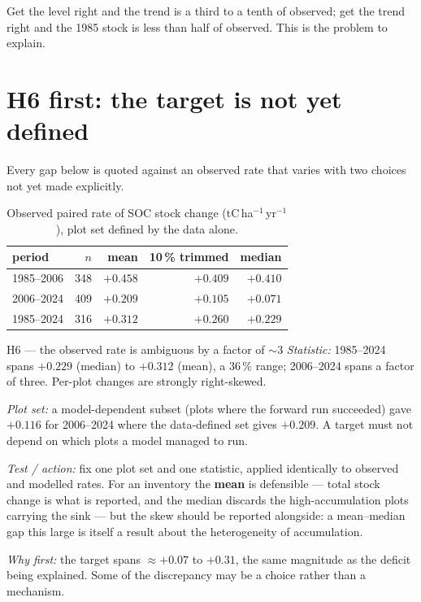 \documentclass[11pt]{article}
\begin{document}
\noindent Get the level right and the trend is a third to a tenth of observed; get the trend right
and the 1985 stock is less than half of observed. This is the problem to explain.

\section{H6 first: the target is not yet defined}

Every gap below is quoted against an observed rate that varies with two choices not yet made
explicitly.

\begin{table}[H]\centering\small
\caption{Observed paired rate of SOC stock change (tC\,ha$^{-1}$\,yr$^{-1}$), plot set defined by
the data alone.}
\begin{tabular}{lrrrr}
\toprule
period & $n$ & mean & 10\,\% trimmed & median\\
\midrule
1985--2006 & 348 & $+0.458$ & $+0.409$ & $+0.410$\\
2006--2024 & 409 & $+0.209$ & $+0.105$ & $+0.071$\\
1985--2024 & 316 & $+0.312$ & $+0.260$ & $+0.229$\\
\bottomrule
\end{tabular}
\end{table}

\begin{hyp}{H6 --- the observed rate is ambiguous by a factor of $\sim$3}
\emph{Statistic:} 1985--2024 spans $+0.229$ (median) to $+0.312$ (mean), a 36\,\% range; 2006--2024
spans a factor of three. Per-plot changes are strongly right-skewed.

\emph{Plot set:} a model-dependent subset (plots where the forward run succeeded) gave $+0.116$
for 2006--2024 where the data-defined set gives $+0.209$. A target must not depend on which plots
a model managed to run.

\smallskip
\emph{Test / action:} fix one plot set and one statistic, applied identically to observed and
modelled rates. For an inventory the \textbf{mean} is defensible --- total stock change is what is
reported, and the median discards the high-accumulation plots carrying the sink --- but the skew
should be reported alongside: a mean--median gap this large is itself a result about the
heterogeneity of accumulation.

\smallskip
\emph{Why first:} the target spans $\approx +0.07$ to $+0.31$, the same magnitude as the deficit
being explained. Some of the discrepancy may be a choice rather than a mechanism.
\end{hyp}
\end{document}

